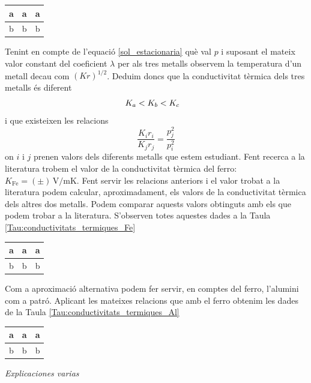 \documentclass[12pt,twosides,onecolumn,openany]{article}
\newenvironment{Figura}
  {\par\medskip\noindent\minipage{\linewidth}}
  {\endminipage\par\medskip}
\begin{document}
\begin{multicols}{2}
\begin{Figura}
  \centering
  \begin{tabular}{c|c|c}
    a & a & a\\
    \hline\hline
    b & b & b
  \end{tabular}
  \label{Tau:dades_regressio}
\end{Figura}
Tenint en compte de l'equació \eqref{sol_estacionaria} què val $p$ i suposant el mateix valor constant del coeficient $\lambda$ per als tres metalls observem la temperatura d'un metall decau com $(Kr)^{1/2}$. Deduim doncs que la conductivitat tèrmica dels tres metalls és diferent 
\begin{equation*}
  K_a < K_b < K_c \hspace{3mm}
\end{equation*}
i que existeixen les relacions
\begin{equation*}
  \frac{K_ir_i}{K_jr_j} = \frac{p^2_j}{p^2_i}
\end{equation*}
on $i$ i $j$ prenen valors dels diferents metalls que estem estudiant. Fent recerca a la literatura trobem el valor de la conductivitat tèrmica del ferro: \(K_{\text{Fe}} = (\pm) \, \text{V}/\text{mK}\). Fent servir les relacions anteriors i el valor trobat a la literatura podem calcular, aproximadament, els valors de la conductivitat tèrmica dels altres dos metalls. Podem comparar aquests valors obtinguts amb els que podem trobar a la literatura. S'observen totes aquestes dades a la Taula \ref{Tau:conductivitats_termiques_Fe}
\begin{Figura}
  \centering
  \begin{tabular}{c|c|c}
    a & a & a\\
    \hline\hline
    b & b & b
  \end{tabular}
  \label{Tau:conductivitats_termiques_Fe}
\end{Figura}
Com a aproximació alternativa podem fer servir, en comptes del ferro, l'alumini com a patró. Aplicant les mateixes relacions que amb el ferro obtenim les dades de la Taula \ref{Tau:conductivitats_termiques_Al}
\begin{Figura}
  \centering
  \begin{tabular}{c|c|c}
    a & a & a\\
    \hline\hline
    b & b & b
  \end{tabular}
  \label{Tau:conductivitats_termiques_Al}
\end{Figura}
\textit{Explicaciones varias}

\end{multicols}
\end{document}
